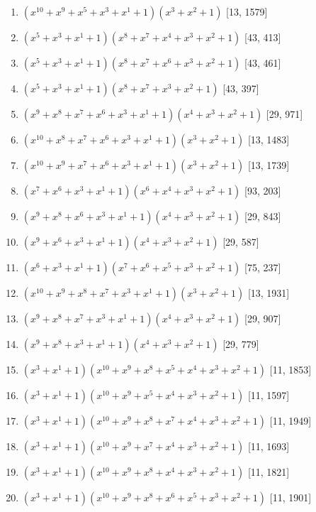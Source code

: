 \documentclass[10pt,twocolumn]{article}
\begin{document}
\begin{enumerate}
\item $(x^{10} + x^{9} + x^{5} + x^{3} + x^{1} + 1)(x^{3} + x^{2} + 1)$  [13, 1579]
\item $(x^{5} + x^{3} + x^{1} + 1)(x^{8} + x^{7} + x^{4} + x^{3} + x^{2} + 1)$  [43, 413]
\item $(x^{5} + x^{3} + x^{1} + 1)(x^{8} + x^{7} + x^{6} + x^{3} + x^{2} + 1)$  [43, 461]
\item $(x^{5} + x^{3} + x^{1} + 1)(x^{8} + x^{7} + x^{3} + x^{2} + 1)$  [43, 397]
\item $(x^{9} + x^{8} + x^{7} + x^{6} + x^{3} + x^{1} + 1)(x^{4} + x^{3} + x^{2} + 1)$  [29, 971]
\item $(x^{10} + x^{8} + x^{7} + x^{6} + x^{3} + x^{1} + 1)(x^{3} + x^{2} + 1)$  [13, 1483]
\item $(x^{10} + x^{9} + x^{7} + x^{6} + x^{3} + x^{1} + 1)(x^{3} + x^{2} + 1)$  [13, 1739]
\item $(x^{7} + x^{6} + x^{3} + x^{1} + 1)(x^{6} + x^{4} + x^{3} + x^{2} + 1)$  [93, 203]
\item $(x^{9} + x^{8} + x^{6} + x^{3} + x^{1} + 1)(x^{4} + x^{3} + x^{2} + 1)$  [29, 843]
\item $(x^{9} + x^{6} + x^{3} + x^{1} + 1)(x^{4} + x^{3} + x^{2} + 1)$  [29, 587]
\item $(x^{6} + x^{3} + x^{1} + 1)(x^{7} + x^{6} + x^{5} + x^{3} + x^{2} + 1)$  [75, 237]
\item $(x^{10} + x^{9} + x^{8} + x^{7} + x^{3} + x^{1} + 1)(x^{3} + x^{2} + 1)$  [13, 1931]
\item $(x^{9} + x^{8} + x^{7} + x^{3} + x^{1} + 1)(x^{4} + x^{3} + x^{2} + 1)$  [29, 907]
\item $(x^{9} + x^{8} + x^{3} + x^{1} + 1)(x^{4} + x^{3} + x^{2} + 1)$  [29, 779]
\item $(x^{3} + x^{1} + 1)(x^{10} + x^{9} + x^{8} + x^{5} + x^{4} + x^{3} + x^{2} + 1)$  [11, 1853]
\item $(x^{3} + x^{1} + 1)(x^{10} + x^{9} + x^{5} + x^{4} + x^{3} + x^{2} + 1)$  [11, 1597]
\item $(x^{3} + x^{1} + 1)(x^{10} + x^{9} + x^{8} + x^{7} + x^{4} + x^{3} + x^{2} + 1)$  [11, 1949]
\item $(x^{3} + x^{1} + 1)(x^{10} + x^{9} + x^{7} + x^{4} + x^{3} + x^{2} + 1)$  [11, 1693]
\item $(x^{3} + x^{1} + 1)(x^{10} + x^{9} + x^{8} + x^{4} + x^{3} + x^{2} + 1)$  [11, 1821]
\item $(x^{3} + x^{1} + 1)(x^{10} + x^{9} + x^{8} + x^{6} + x^{5} + x^{3} + x^{2} + 1)$  [11, 1901]

\end{enumerate}
\end{document}
